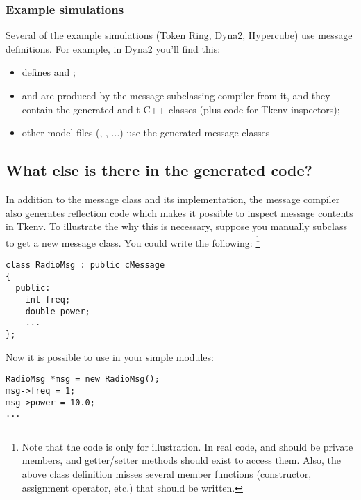 \subsubsection{Example simulations}

Several of the example simulations (Token Ring, Dyna2, Hypercube)
use message definitions. For example, in Dyna2 you'll find this:

\begin{itemize}
 \item {} defines  and ;
 \item {} and  are produced
   by the message subclassing compiler from it, and they contain
   the generated  and t
   C++ classes (plus code for Tkenv inspectors);
 \item other model files (, , ...)
   use the generated message classes
\end{itemize}



\subsection{What else is there in the generated code?}

In addition to the message class and its implementation,
the message compiler also generates reflection code which makes it
possible to inspect message contents in Tkenv.
To illustrate the why this is necessary, suppose you manually subclass
 to get a new message class. You could write the following:
  \footnote{Note that the code is only for illustration.
  In real code,  and  should be private members,
  and getter/setter methods should exist to access them.
  Also, the above class definition misses several member functions
  (constructor, assignment operator, etc.) that should be written.}

\begin{verbatim}
class RadioMsg : public cMessage
{
  public:
    int freq;
    double power;
    ...
};
\end{verbatim}

Now it is possible to use  in your simple modules:

\begin{verbatim}
RadioMsg *msg = new RadioMsg();
msg->freq = 1;
msg->power = 10.0;
...
\end{verbatim}

